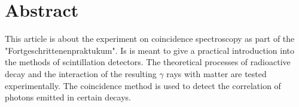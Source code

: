 \section*{Abstract}
%
This article is about the experiment on coincidence spectroscopy as part of the "Fortgeschrittenenpraktukum". 
Is is meant to give a practical introduction into the methods of scintillation detectors.
The theoretical processes of radioactive decay and the interaction of the resulting $\gamma$ rays with matter are tested experimentally.
The coincidence method is used to detect the correlation of photons emitted in certain decays.
